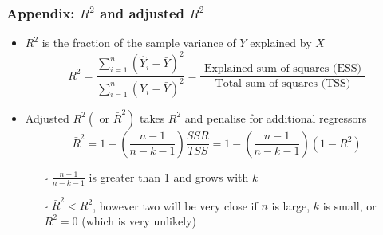 \documentclass[11pt, xcolor=x11names,compress]{beamer}
\begin{document}
\begin{frame}[fragile,t]
\frametitle{Appendix: $R^2$ and adjusted $R^2$}\label{R2}
\begin{itemize}
    \item $R^{2}$ is the fraction of the sample variance of $Y$ explained by $X$
$$
R^{2}=\frac{\sum_{i=1}^{n}\left(\widehat{Y}_{i}-\bar{Y}\right)^{2}}{\sum_{i=1}^{n}\left(Y_{i}-\bar{Y}\right)^{2}}=\frac{\text { Explained sum of squares (ESS) }}{\text { Total sum of squares (TSS) }}
$$
    \item Adjusted $R^{2}\left(\right.$ or $\left.\bar{R}^{2}\right)$ takes $R^{2}$ and penalise for additional regressors
$$
\bar{R}^{2}=1-\left(\frac{n-1}{n-k-1}\right) \frac{S S R}{T S S}=1-\left(\frac{n-1}{n-k-1}\right)\left(1-R^{2}\right)
$$
    \begin{itemize}
        \item [$\square$] $\frac{n-1}{n-k-1}$ is greater than 1 and grows with $k$
        \item [$\square$] $\bar{R}^{2}<R^{2}$, however two will be very close if $n$ is large, $k$ is small, or $R^{2}=0$ (which is very unlikely)
    \end{itemize}
\end{itemize}
\hyperlink{R2b}{}
 \end{frame}

\end{document}
